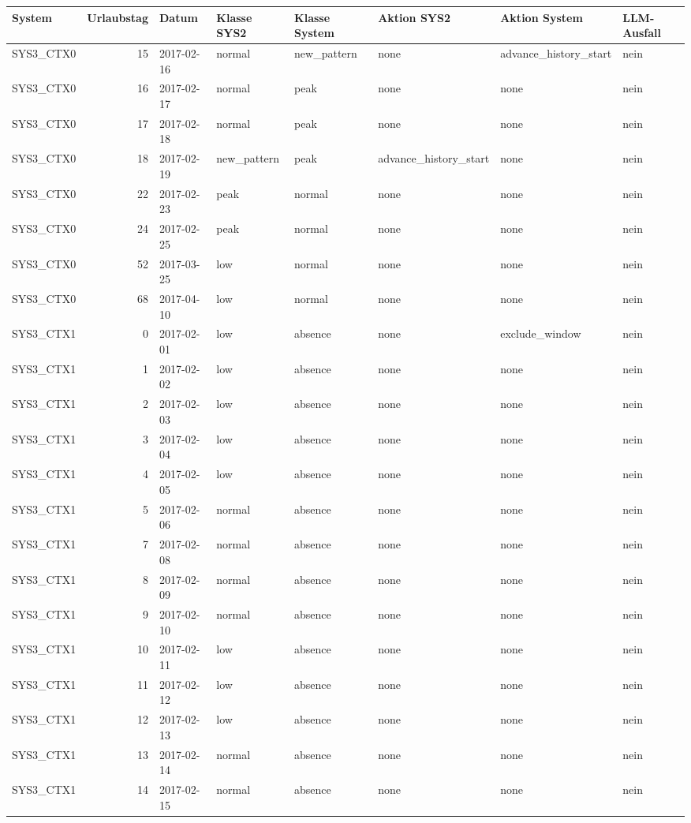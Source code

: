 \begin{tabular}{lrllllll}
\toprule
System & Urlaubstag & Datum & Klasse SYS2 & Klasse System & Aktion SYS2 & Aktion System & LLM-Ausfall \\
\midrule
SYS3\_CTX0 & 15 & 2017-02-16 & normal & new\_pattern & none & advance\_history\_start & nein \\
SYS3\_CTX0 & 16 & 2017-02-17 & normal & peak & none & none & nein \\
SYS3\_CTX0 & 17 & 2017-02-18 & normal & peak & none & none & nein \\
SYS3\_CTX0 & 18 & 2017-02-19 & new\_pattern & peak & advance\_history\_start & none & nein \\
SYS3\_CTX0 & 22 & 2017-02-23 & peak & normal & none & none & nein \\
SYS3\_CTX0 & 24 & 2017-02-25 & peak & normal & none & none & nein \\
SYS3\_CTX0 & 52 & 2017-03-25 & low & normal & none & none & nein \\
SYS3\_CTX0 & 68 & 2017-04-10 & low & normal & none & none & nein \\
SYS3\_CTX1 & 0 & 2017-02-01 & low & absence & none & exclude\_window & nein \\
SYS3\_CTX1 & 1 & 2017-02-02 & low & absence & none & none & nein \\
SYS3\_CTX1 & 2 & 2017-02-03 & low & absence & none & none & nein \\
SYS3\_CTX1 & 3 & 2017-02-04 & low & absence & none & none & nein \\
SYS3\_CTX1 & 4 & 2017-02-05 & low & absence & none & none & nein \\
SYS3\_CTX1 & 5 & 2017-02-06 & normal & absence & none & none & nein \\
SYS3\_CTX1 & 7 & 2017-02-08 & normal & absence & none & none & nein \\
SYS3\_CTX1 & 8 & 2017-02-09 & normal & absence & none & none & nein \\
SYS3\_CTX1 & 9 & 2017-02-10 & normal & absence & none & none & nein \\
SYS3\_CTX1 & 10 & 2017-02-11 & low & absence & none & none & nein \\
SYS3\_CTX1 & 11 & 2017-02-12 & low & absence & none & none & nein \\
SYS3\_CTX1 & 12 & 2017-02-13 & low & absence & none & none & nein \\
SYS3\_CTX1 & 13 & 2017-02-14 & normal & absence & none & none & nein \\
SYS3\_CTX1 & 14 & 2017-02-15 & normal & absence & none & none & nein \\

\end{tabular}
